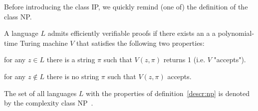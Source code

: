 
Before introducing the class IP, we quickly remind (one of) the definition of the class NP.

\begin{defn}
    A language $L$ admits efficiently verifiable proofs if there exists an a a polynomial-time Turing machine $V$ that satisfies the following two properties: 
    \begin{description}\label{descr:np}
        \item[Completeness: ]for any $z \in L$ there is a string $\pi$ such that $V(z, \pi)$ returns 1 (i.e. $V$ "accepts").
        \item[Soundness: ]for any $z \notin L$ there is no string $\pi$ such that $V(z, \pi)$ accepts. 
    \end{description}
\end{defn}

\begin{defn}
    The set of all languages $L$ with the properties of definition~\ref{descr:np} is denoted by the complexity class NP~\cite{mipre}.
\end{defn}



